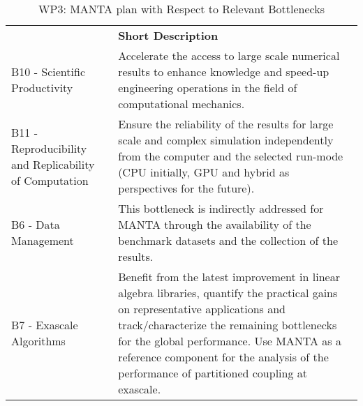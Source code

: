 \begin{table}[h!]
    \centering
    
    

    \centering
    { 
        \setlength{\parindent}{0pt}
        \def\arraystretch{1.25}
        {
            \fontsize{9}{11}\selectfont
            \begin{tabular}{!{\color{numpexgray}\vrule}p{.25\linewidth}!{\color{numpexgray}\vrule}p{.6885\linewidth}!{\color{numpexgray}\vrule}}
    
     &  {\rule{0pt}{2.5ex}\color{white}\bf Short Description }\\ 
    
    B10 - Scientific Productivity & Accelerate the access to large scale numerical results to enhance knowledge and speed-up engineering operations in the field of computational mechanics. \\
    B11 - Reproducibility and Replicability of Computation & Ensure the reliability of the results for large scale and complex simulation independently from the computer and the selected run-mode (CPU initially, GPU and hybrid as perspectives for the future). \\
    B6 - Data Management & This bottleneck is indirectly addressed for MANTA through the availability of the benchmark datasets and the collection of the results. \\
    B7 - Exascale Algorithms & Benefit from the latest improvement in linear algebra libraries, quantify the practical gains on representative applications and track/characterize the remaining bottlenecks for the global performance. Use MANTA as a reference component for the analysis of the performance of partitioned coupling at exascale.\\
\end{tabular}
        }
    }
    \caption{WP3: MANTA plan with Respect to Relevant Bottlenecks}
    \label{tab:WP3:MANTA:bottlenecks}
\end{table}